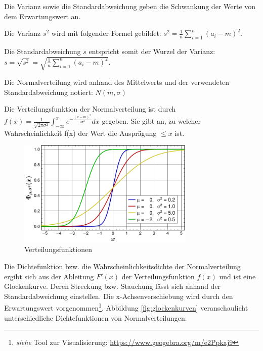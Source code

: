 Die Varianz sowie die Standardabweichung geben die Schwankung der Werte von dem Erwartungswert an.

Die Varianz $s^2$ wird mit folgender Formel gebildet: $s^2 = \frac{1}{n} \sum_{i=1}^n (a_i-m)^2$.

Die Standardabweichung $s$ entspricht somit der Wurzel der Varianz: $s = \sqrt{s^2} = \sqrt{\frac{1}{n} \sum_{i=1}^n (a_i-m)^2}$.

Die Normalverteilung wird anhand des Mittelwerts und der verwendeten Standardabweichung notiert: $N(m, \sigma)$

Die Verteilungsfunktion der Normalverteilung ist durch $f(x) = \frac{1}{\sqrt{2 \pi \sigma^2}} \int_{-\infty}^x e^{-\frac{(x-m)^2}{2 \sigma^2}} dx$ gegeben. Sie gibt an, zu welcher Wahrscheinlichkeit f(x) der Wert die Ausprägung $\le x$ ist.

\begin{figure}[H]
\centering
\includegraphics[width=0.75\textwidth]{img/Verteilungskurven.png}
\caption[Verteilungsfunktionen]{Verteilungsfunktionen\protect\footnotemark}
\label{fig:verteilungskurven}
\end{figure}

Die Dichtefunktion bzw. die Wahrscheinlichkeitsdichte der Normalverteilung ergibt sich aus der Ableitung $F'(x)$ der Verteilungsfunktion $f(x)$ und ist eine Glockenkurve. Deren Streckung bzw. Stauchung lässt sich anhand der Standardabweichung einstellen. Die x-Achsenverschiebung wird durch den Erwartungswert vorgenommen\footnote{\textit{siehe} Tool zur Visualisierung: \url{https://www.geogebra.org/m/e2Ppkaj9}}. Abbildung \ref{fig:glockenkurven} veranschaulicht unterschiedliche Dichtefunktionen von Normalverteilungen.

